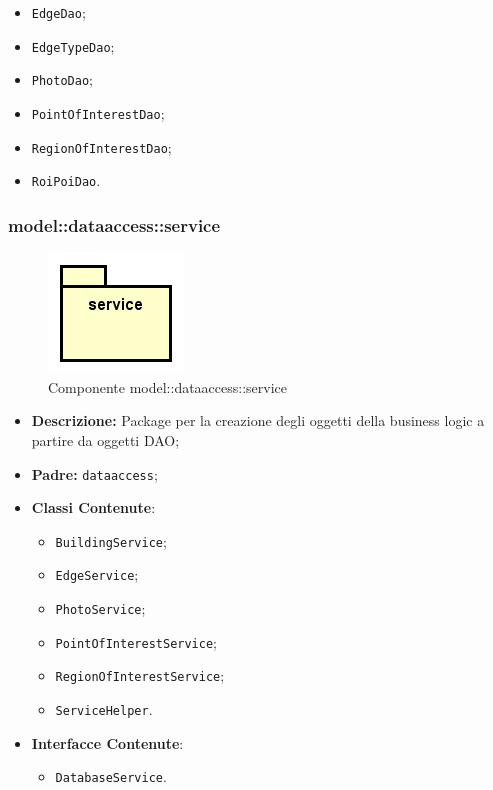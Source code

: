\documentclass[../DefinizioneDiProdotto.tex]{subfiles}
\begin{document}
\begin{itemize}
\begin{itemize}
\item \texttt{EdgeDao};

\item \texttt{EdgeTypeDao};

\item \texttt{PhotoDao};

\item \texttt{PointOfInterestDao};

\item \texttt{RegionOfInterestDao};

\item \texttt{RoiPoiDao}.

\end{itemize}
\end{itemize}

\subsubsection{model::\-dataaccess::\-service}

    \begin{figure}[H]
        \centering
        \includegraphics{img/package/service.png}
        \caption{Componente model::\-dataaccess::\-service}\label{fig:model::dataaccess::service} 
    \end{figure}
    \begin{itemize}
\item \textbf{Descrizione:} Package per la creazione degli oggetti della business logic a partire da oggetti DAO;
\item \textbf{Padre:} \texttt{dataaccess};
\item \textbf{Classi Contenute}:
\begin{itemize}
\item \texttt{BuildingService};

\item \texttt{EdgeService};

\item \texttt{PhotoService};

\item \texttt{PointOfInterestService};

\item \texttt{RegionOfInterestService};

\item \texttt{ServiceHelper}.

\end{itemize}
\item \textbf{Interfacce Contenute}:
\begin{itemize}
\item \texttt{DatabaseService}.

\end{itemize}
\end{itemize}
\end{document}
